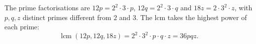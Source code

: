 The prime factorisations are $12p=2^2\cdot3\cdot p$, $12q=2^2\cdot3\cdot q$ and $18z=2\cdot3^2\cdot z$, with $p,q,z$ distinct primes different from $2$ and $3$. The lcm takes the highest power of each prime:
\[\operatorname{lcm}(12p,12q,18z)=2^2\cdot3^2\cdot p\cdot q\cdot z=\boxed{36pqz}.\]
